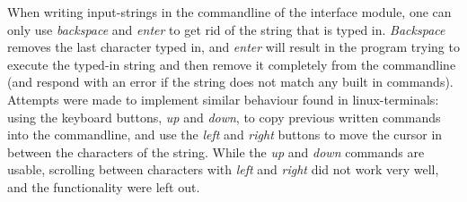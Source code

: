 \documentclass[main.tex]{subfiles}
\begin{document}
When writing input-strings in the commandline of the interface module, one can only use \textit{backspace} and \textit{enter} to get rid of the string that is typed in. \textit{Backspace} removes the last character typed in, and \textit{enter} will result in the program trying to execute the typed-in string and then remove it completely from the commandline (and respond with an error if the string does not match any built in commands). Attempts were made to implement similar behaviour found in linux-terminals: using the keyboard buttons, \textit{up} and \textit{down}, to copy previous written commands into the commandline, and use the \textit{left} and \textit{right} buttons to move the cursor in between the characters of the string. While the \textit{up} and \textit{down} commands are usable, scrolling between characters with \textit{left} and \textit{right} did not work very well, and the functionality were left out. 
\end{document}
